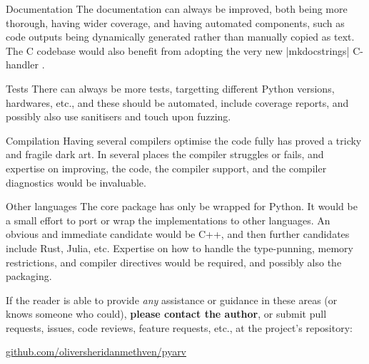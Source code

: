 \begin{longdescription}
	\item[Documentation] The documentation can always be improved, both being more thorough, having wider coverage, and having automated components, such as code outputs being dynamically generated rather than manually copied as text. The C codebase would also benefit from adopting the very new \inlineplain|mkdocstrings| C-handler \citep{mazzucotelli2025mkdocstringc}. 
	
	\item[Tests] There can always be more tests, targetting different Python versions, hardwares, etc., and these should be automated, include coverage reports, and possibly also use sanitisers and touch upon fuzzing. 
	\item[Compilation] Having several compilers optimise the code fully has proved a tricky and fragile dark art. In several places the compiler struggles or fails, and expertise on improving, the code, the compiler support, and the compiler diagnostics would be invaluable. 
	
	\item[Other languages] The core \arv package has only be wrapped for Python. It would be a small effort to port or wrap the implementations to other languages. An obvious and immediate candidate would be C++, and then further candidates include Rust, Julia, etc. Expertise on how to handle the type-punning, memory restrictions, and compiler directives would be required, and possibly also the packaging. 
\end{longdescription}

If the reader is able to provide \textit{any} assistance or guidance in these areas (or knows someone who could), \textbf{please contact the author}, or submit pull requests, issues, code reviews, feature requests, etc., at the project's repository:\\
\centerline{\url{github.com/oliversheridanmethven/pyarv}}